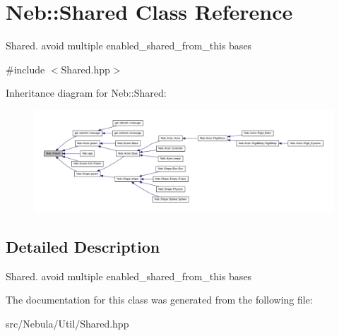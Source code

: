 \hypertarget{classNeb_1_1Shared}{\section{\-Neb\-:\-:\-Shared \-Class \-Reference}
\label{classNeb_1_1Shared}
}


\-Shared. avoid multiple enabled\-\_\-shared\-\_\-from\-\_\-this bases  




{\ttfamily \#include $<$\-Shared.\-hpp$>$}



\-Inheritance diagram for \-Neb\-:\-:\-Shared\-:\nopagebreak
\begin{figure}[H]
\begin{center}
\leavevmode
\includegraphics[width=350pt]{classNeb_1_1Shared__inherit__graph}
\end{center}
\end{figure}


\subsection{\-Detailed \-Description}
\-Shared. avoid multiple enabled\-\_\-shared\-\_\-from\-\_\-this bases 

\-The documentation for this class was generated from the following file\-:\begin{DoxyCompactItemize}
\item 
src/\-Nebula/\-Util/\-Shared.\-hpp\end{DoxyCompactItemize}
